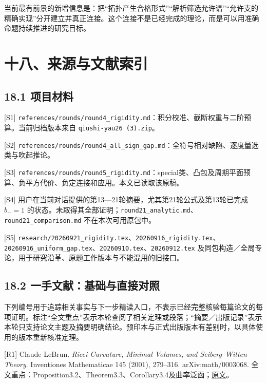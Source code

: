 \documentclass[
  11pt,
  a4paper,
  fontset=none]{ctexart}
\begin{document}
当前最有前景的新增信息是：把``拓扑产生合格形式''``解析筛选允许谱''``允许支的精确实现''分开建立并真正连接。这个连接不是已经完成的理论，而是可以用准确命题持续推进的研究目标。

\clearpage
\raggedright
\section{十八、来源与文献索引}\label{ux5341ux516bux6765ux6e90ux4e0eux6587ux732eux7d22ux5f15}

\subsection{18.1 项目材料}\label{ux9879ux76eeux6750ux6599}

{[}S1{]}
\nolinkurl{references/rounds/round4_rigidity.md}：积分校准、截断权重与二阶预算。当前归档版本来自
\nolinkurl{qiushi-yau26 (3).zip}。

{[}S2{]}
\nolinkurl{references/rounds/round4_all_sign_gap.md}：全符号相对缺陷、逐度量选类与吹起推论。

{[}S3{]}
\nolinkurl{references/rounds/round5_rigidity.md}：special类、凸包及周期平面预算、负平方代价、负定连接和应用。本文已读取该原稿。

{[}S4{]}
用户在当前对话提供的第13---21轮摘要，尤其第21轮公式及第13轮已完成
\(b_+=1\)
的状态。未取得其全部证明；\nolinkurl{round21_analytic.md}、\nolinkurl{round21_comparison.md}
不在本次可用原包中。

{[}S5{]}
\nolinkurl{research/20260921_rigidity.tex}、\nolinkurl{20260916_rigidity.tex}、\nolinkurl{20260916_uniform_gap.tex}、\nolinkurl{20260910.tex}、\nolinkurl{20260912.tex}
及同包构造／全局专论，用于研究沿革、原题工作版本与不能混用的旧接口。

\subsection{18.2
一手文献：基础与直接对照}\label{ux4e00ux624bux6587ux732eux57faux7840ux4e0eux76f4ux63a5ux5bf9ux7167}

下列编号用于追踪相关事实与下一步精读入口，不表示已经完整核验每篇论文的每项证明。标注``全文重点''表示本轮查阅了相关定理或段落；``摘要／出版记录''表示本轮只支持论文主题及摘要明确结论。预印本与正式出版版本有差别时，以具体使用的版本重新核准定理。

{[}R1{]} Claude LeBrun. \emph{Ricci Curvature, Minimal Volumes, and
Seiberg--Witten Theory}. Inventiones Mathematicae 145 (2001), 279--316.
arXiv:math/0003068.
全文重点：Proposition3.2、Theorem3.3、Corollary3.4及曲率泛函；\href{https://arxiv.org/abs/math/0003068}{原文}。
\end{document}

